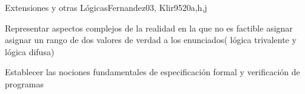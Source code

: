 \begin{syllabus}
\begin{unit}{Extensiones y otras Lógicas}{Fernandez03, Klir95}{20}{a,h,j}
   \begin{unitgoals}
      \item Representar aspectos complejos de la realidad en la que no es factible asignar asignar un rango de dos valores de verdad a los enunciados( lógica trivalente y lógica difusa)
      \item Establecer las nociones fundamentales de especificación formal y verificación de programas
   \end{unitgoals}
\end{unit}



\begin{coursebibliography}
\end{coursebibliography}

\end{syllabus}

%
